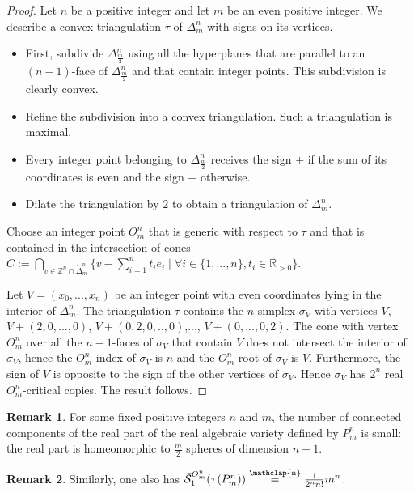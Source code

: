 \documentclass[12pt]{article}
\newcommand\customeq{\stackrel{\mathclap{\normalfont\scriptsize\mbox{n}}}{=}}
\newcommand{\R}{\mathbb{R}}
\newcommand{\Z}{\mathbb{Z}}
\theoremstyle{definition}
\newtheorem{rmk}{Remark}[section]
\begin{document}
\begin{proof}
    Let $n$ be a positive integer and let $m$ be an even positive integer. We describe a convex triangulation $\tau$ of $\Delta_m^n$ with signs on its vertices.
    \begin{itemize}
        \item First, subdivide $\Delta_{\frac{m}{2}}^n$ using all the hyperplanes that are parallel to an $(n-1)$-face of $\Delta_{\frac{m}{2}}^n$ and that contain integer points. This subdivision is clearly convex.
        \item Refine the subdivision into a convex triangulation. Such a triangulation is maximal.
        \item Every integer point belonging to $\Delta_{\frac{m}{2}}^n$ receives the sign $+$ if the sum of its coordinates is even and the sign $-$ otherwise.
        \item Dilate the triangulation by $2$ to obtain a triangulation of $\Delta_m^n$.
    \end{itemize}
    Choose an integer point $O_m^n$ that is generic with respect to $\tau$ and that is contained in the intersection of cones $C := \bigcap_{v \in \Z^n \cap \mathring\Delta_m^n}\{ v- \sum_{i=1}^n t_ie_i \; | \; \forall i \in \{1,...,n\}, t_i \in \R_{>0} \}$.
    
    Let $V = (x_0,...,x_n)$ be an integer point with even coordinates lying in the interior of $\Delta_m^n$. The triangulation $\tau$ contains the $n$-simplex $\sigma_V$ with vertices $V$, $V + (2,0,...,0)$, $V + (0,2,0,..,0)$,..., $V + (0,...,0,2)$. The cone with vertex $O_m^n$ over all the $n-1$-faces of $\sigma_V$ that contain $V$ does not intersect the interior of $\sigma_V$, hence the $O_m^n$-index of $\sigma_V$ is $n$ and the $O_m^n$-root of $\sigma_V$ is $V$. Furthermore, the sign of $V$ is opposite to the sign of the other vertices of $\sigma_V$. Hence $\sigma_V$ has $2^n$ real $O_m^n$-critical copies. The result follows.
\end{proof}

\begin{rmk}
    For some fixed positive integers $n$ and $m$, the number of connected components of the real part of the real algebraic variety defined by $P_m^n$ is small: the real part is homeomorphic to $\frac{m}{2}$ spheres of dimension $n-1$.
\end{rmk}

\begin{rmk}
    Similarly, one also has $\Bar{\mathcal{S}}_1^{O_m^n}(\tau(P_m^n)) \customeq \frac{1}{2^n n!}m^n$.
\end{rmk}
\end{document}
